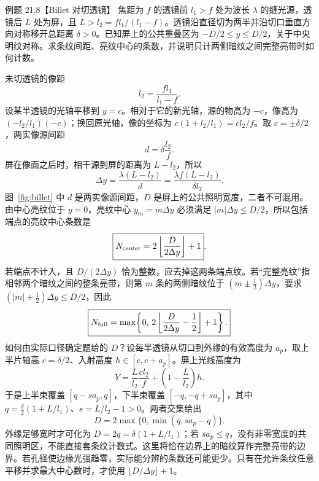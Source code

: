 \begin{origexamplebox}{例题 21.8【Billet 对切透镜】}
焦距为 $f$ 的透镜前 $l_1>f$ 处为波长 $\lambda$ 的缝光源，透镜后 $L$ 处为屏，且 $L>l_2=fl_1/(l_1-f)$。透镜沿直径切为两半并沿切口垂直方向对称移开总距离 $\delta>0$。已知屏上的公共重叠区为 $-D/2\le y\le D/2$，关于中央明纹对称。求条纹间距、亮纹中心的条数，并说明只计两侧暗纹之间完整亮带时如何计数。
\end{origexamplebox}
\begin{xesolution}
\BilletSourceDiagram
未切透镜的像距
\[
 l_2=\frac{fl_1}{l_1-f}.
\]
设某半透镜的光轴平移到 $y=c$。相对于它的新光轴，源的物高为 $-c$，像高为 $(-l_2/l_1)(-c)$；换回原光轴，像的坐标为 $c(1+l_2/l_1)=cl_2/f$。取 $c=\pm\delta/2$，两实像源间距
\[
 d=\delta\frac{l_2}{f}.
\]
屏在像面之后时，相干源到屏的距离为 $L-l_2$，所以
\[
 \boxed{\Delta y=\frac{\lambda(L-l_2)}d
 =\frac{\lambda f(L-l_2)}{\delta l_2}}.
\]
图~\ref{fig:billet} 中 $d$ 是两实像源间距，$D$ 是屏上的公共照明宽度，二者不可混用。由中心亮纹位于 $y=0$，亮纹中心 $y_m=m\Delta y$ 必须满足 $|m|\Delta y\le D/2$，所以包括端点的亮纹中心条数是
\[
 \boxed{N_{\rm center}=2\left\lfloor\frac{D}{2\Delta y}\right\rfloor+1}.
\]
若端点不计入，且 $D/(2\Delta y)$ 恰为整数，应去掉这两条端点纹。若“完整亮纹”指相邻两个暗纹之间的整条亮带，则第 $m$ 条的两侧暗纹位于 $(m\pm\tfrac12)\Delta y$，要求 $(|m|+\tfrac12)\Delta y\le D/2$，因此
\[
 \boxed{N_{\rm full}=\max\!\left\{0,\,
 2\left\lfloor\frac{D}{2\Delta y}-\frac12\right\rfloor+1\right\}.}
\]
如何由实际口径确定题给的 $D$？设每半透镜从切口到外缘的有效高度为 $a_p$，取上半片轴高 $c=\delta/2$、入射高度 $h\in[c,c+a_p]$。屏上光线高度为
\[
 Y=\frac{L}{l_2}\frac{cl_2}{f}+\left(1-\frac{L}{l_2}\right)h.
\]
于是上半束覆盖 $[q-sa_p,q]$，下半束覆盖 $[-q,-q+sa_p]$，其中
$q=\frac\delta2(1+L/l_1)$、$s=L/l_2-1>0$。两者交集给出
\[
 \boxed{D=2\max\{0,\min(q,sa_p-q)\}.}
\]
外缘足够宽时才可化为 $D=2q=\delta(1+L/l_1)$；若 $sa_p\le q$，没有非零宽度的共同照明区，不能直接套条纹计数式。这里将恰在边界上的暗纹算作完整亮带的边界。若孔径使边缘光强趋零，实际能分辨的条数还可能更少。只有在允许条纹任意平移并求最大中心数时，才使用 $\lfloor D/\Delta y\rfloor+1$。
\end{xesolution}

